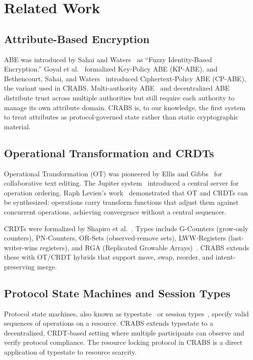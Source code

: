 \documentclass[sigconf,nonacm]{acmart}
\newcommand{\crab}{\textsc{CRABS}}
\begin{document}
\section{Related Work}

\subsection{Attribute-Based Encryption}

ABE was introduced by Sahai and Waters~\cite{sahai2005fuzzy} as ``Fuzzy Identity-Based Encryption.'' Goyal et al.~\cite{goyal2006abe} formalized Key-Policy ABE (KP-ABE), and Bethencourt, Sahai, and Waters~\cite{bethencourt2007cpabe} introduced Ciphertext-Policy ABE (CP-ABE), the variant used in \crab{}. Multi-authority ABE~\cite{chase2007multi} and decentralized ABE~\cite{lewko2011decentralizing} distribute trust across multiple authorities but still require each authority to manage its own attribute domain. \crab{} is, to our knowledge, the first system to treat attributes as protocol-governed state rather than static cryptographic material.

\subsection{Operational Transformation and CRDTs}

Operational Transformation (OT) was pioneered by Ellis and Gibbs~\cite{ellis1989ot} for collaborative text editing. The Jupiter system~\cite{nichols1995jupiter} introduced a central server for operation ordering. Raph Levien's work~\cite{levien2016otcrdt} demonstrated that OT and CRDTs can be synthesized: operations carry transform functions that adjust them against concurrent operations, achieving convergence without a central sequencer.

CRDTs were formalized by Shapiro et al.~\cite{shapiro2011crdt}. Types include G-Counters (grow-only counters), PN-Counters, OR-Sets (observed-remove sets), LWW-Registers (last-writer-wins registers), and RGA (Replicated Growable Arrays)~\cite{levien2016rga}. \crab{} extends these with OT/CRDT hybrids that support move, swap, reorder, and intent-preserving merge.

\subsection{Protocol State Machines and Session Types}

Protocol state machines, also known as typestate~\cite{deline2004typestate} or session types~\cite{honda1998session}, specify valid sequences of operations on a resource. \crab{} extends typestate to a decentralized, CRDT-based setting where multiple participants can observe and verify protocol compliance. The resource locking protocol in \crab{} is a direct application of typestate to resource scarcity.
\end{document}
